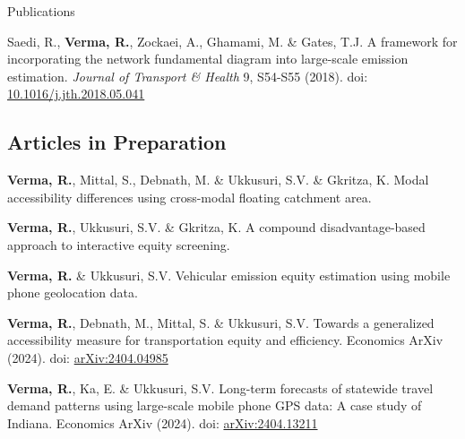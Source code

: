 \documentclass{CV} %
\begin{document}
\begin{rSection}{Publications}
\begin{etaremune}
        \item Saedi, R., \textbf{Verma, R.}, Zockaei, A., Ghamami, M. \& Gates, T.J. A framework for incorporating the network fundamental diagram into large-scale emission estimation. \textit{Journal of Transport \& Health} 9, S54-S55 (2018). doi: \href{https://www.sciencedirect.com/science/article/abs/pii/S2214140518302263}{10.1016/j.jth.2018.05.041}
    \end{etaremune}
    
    \subsection*{Articles in Preparation}
    \begin{etaremune}
        \item \textbf{Verma, R.}, Mittal, S., Debnath, M. \& Ukkusuri, S.V. \& Gkritza, K. Modal accessibility differences using cross-modal floating catchment area.
        
        \item \textbf{Verma, R.}, Ukkusuri, S.V. \& Gkritza, K. A compound disadvantage-based approach to interactive equity screening.
        
        \item \textbf{Verma, R.} \& Ukkusuri, S.V. Vehicular emission equity estimation using mobile phone geolocation data.
        
        \item \textbf{Verma, R.}, Debnath, M., Mittal, S. \& Ukkusuri, S.V. Towards a generalized accessibility measure for transportation equity and efficiency. Economics ArXiv (2024). doi: \href{https://arxiv.org/abs/2404.04985}{arXiv:2404.04985}
    
        \item \textbf{Verma, R.}, Ka, E. \& Ukkusuri, S.V. Long-term forecasts of statewide travel demand patterns using large-scale mobile phone GPS data: A case study of Indiana. Economics ArXiv (2024). doi: \href{https://arxiv.org/abs/2404.13211}{arXiv:2404.13211}
    \end{etaremune}
\end{rSection}
\end{document}
